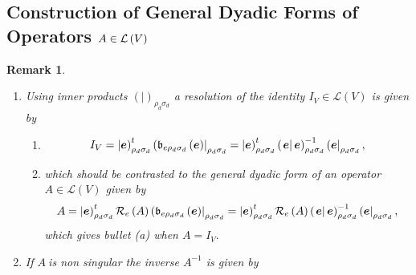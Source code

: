 \documentclass[aps,preprint]{revtex4}
\newtheorem{remark}[theorem]{Remark}
\begin{document}
\subsection{Construction of General Dyadic Forms of Operators $A\in \mathcal{%
L}\left( V\right) $ \label{Construction of General Dyadic Forms of Operators}%
}

\begin{remark}
\begin{enumerate}
\item Using inner products $\left( \left. {}\right\vert \right) _{\rho
_{d}\sigma _{d}}$ a resolution of the identity $I_{V}\in \mathcal{L}\left(
V\right) $ is given by

\begin{enumerate}
\item 
\begin{equation}
I_{V}=\left\vert \overset{}{\boldsymbol{e}}\right) _{\rho _{d}\sigma
_{d}}^{t}\left( \mathfrak{b}_{e\rho _{d}\sigma _{d}}\left( \overset{}{%
\boldsymbol{e}}\right) \right\vert _{\rho _{d}\sigma _{d}}=\left\vert 
\overset{}{\boldsymbol{e}}\right) _{\rho _{d}\sigma _{d}}^{t}\left( \left. 
\overset{}{\boldsymbol{e}}\right\vert \boldsymbol{e}\right) _{\rho
_{d}\sigma _{d}}^{-1}\left( \overset{}{\boldsymbol{e}}\right\vert _{\rho
_{d}\sigma _{d}},
\end{equation}

\item which should be contrasted to the general dyadic form of an operator $%
A\in \mathcal{L}\left( V\right) $ given by 
\begin{equation}
A=\left\vert \overset{}{\boldsymbol{e}}\right) _{\rho _{d}\sigma _{d}}^{t}%
\mathcal{R}_{e}\left( A\right) \left( \mathfrak{b}_{e\rho _{d}\sigma
_{d}}\left( \overset{}{\boldsymbol{e}}\right) \right\vert _{\rho _{d}\sigma
_{d}}=\left\vert \overset{}{\boldsymbol{e}}\right) _{\rho _{d}\sigma
_{d}}^{t}\mathcal{R}_{e}\left( A\right) \left( \left. \overset{}{\boldsymbol{%
e}}\right\vert \boldsymbol{e}\right) _{\rho _{d}\sigma _{d}}^{-1}\left( 
\overset{}{\boldsymbol{e}}\right\vert _{\rho _{d}\sigma _{d}},
\end{equation}%
which gives bullet (a) when $A=I_{V}.$
\end{enumerate}

\item If $A\ $is non singular the inverse $A^{-1}$ is given by


\end{enumerate}
\end{remark}
\end{document}
